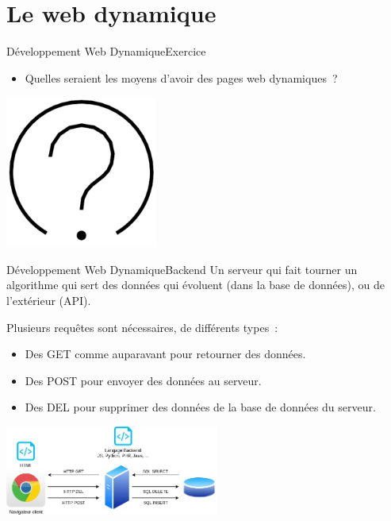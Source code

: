 \documentclass{beamer}
\begin{document}
\section{Le web dynamique}\label{sec:Dynamic}
\begin{frame}{Développement Web Dynamique}{Exercice \execcounterdispinc{}}
    \begin{itemize}
        \item Quelles seraient les moyens d'avoir des pages web dynamiques~?
    \end{itemize}
    \bigbreak
    \centering
    \includegraphics[width=5cm]{image/question-mark}
\end{frame}

\begin{frame}{Développement Web Dynamique}{Backend}
    Un serveur qui fait tourner un algorithme qui sert des données qui évoluent (dans la base de données), ou de l'extérieur (API).

    Plusieurs requêtes sont nécessaires, de différents types~:
    \begin{itemize}
        \item Des GET comme auparavant pour retourner des données.
        \item Des POST pour envoyer des données au serveur.
        \item Des DEL pour supprimer des données de la base de données du serveur.
    \end{itemize}
    \bigbreak
    \centering
    \includegraphics[width=7cm]{image/web-dynamic-backend}
\end{frame}
\end{document}
